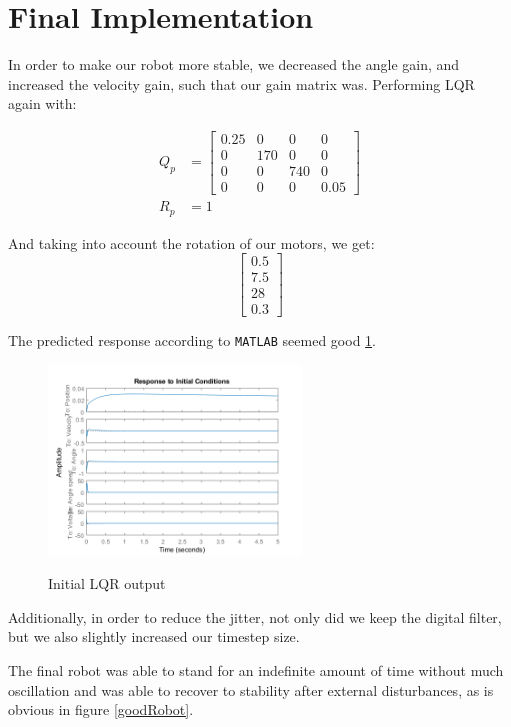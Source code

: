 \documentclass{article}
\begin{document}
\section{Final Implementation}

In order to make our robot more stable, we decreased the angle gain, and increased the velocity gain, such that our gain matrix was. Performing LQR again with:

\begin{align*}
    Q_p &= \begin{bmatrix}
        0.25&0&0&0\\
        0&170&0&0\\
        0&0&740&0 \\
        0&0&0&0.05
    \end{bmatrix}\\
    R_p &= 1    
\end{align*}

And taking into account the rotation of our motors, we get:
\[
\begin{bmatrix}
    0.5 \\
    7.5\\
    28\\
    0.3    
\end{bmatrix}    
\]

The predicted response according to \texttt{MATLAB} seemed good \ref{lqrf}.

\begin{figure}[H]
    \caption{Initial LQR output}
    \centering
    \includegraphics[width=0.6\textwidth]{lqrOut_final.png}
    \label{lqrf}
\end{figure}

Additionally, in order to reduce the jitter, not only did we keep the digital filter, but we also slightly increased our timestep size.

The final robot was able to stand for an indefinite amount of time without much oscillation and was able to recover to stability after external disturbances, as is obvious in figure \ref{goodRobot}.
\end{document}
